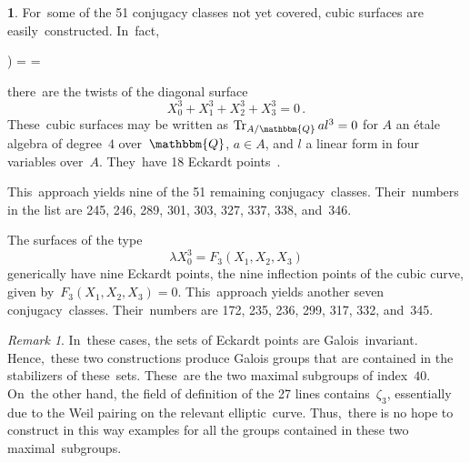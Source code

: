 \documentclass[reqno]{amsart}
\theoremstyle{definition}
\newtheorem{ttt}[theorem]{}
\theoremstyle{remark}
\newtheorem{rem}[theorem]{Remark}
\numberwithin{equation}{section}
\newcommand{\bbQ}{\mathbbm{Q}}
\newcommand{\Tr}{\mathop{\rm Tr}\nolimits}
\newcounter{iii}
\newenvironment{iii}{\begin{list}{\rm \roman{iii}) }%
{\usecounter{iii} \leftmargin=0.0pt \labelsep=0.0pt %
\listparindent=0.0pt \labelwidth=0.0pt \parsep=\smallskipamount%
 \itemsep=0.0pt \topsep=0.0pt \partopsep=\smallskipamount}}{\end{list}}
\begin{document}
\begin{ttt}\smallskip
For~some of the 51 conjugacy classes not yet covered, cubic surfaces are easily~constructed. In~fact,

\begin{iii}
\item
there~are the twists of the diagonal surface
$$X_0^3 + X_1^3 + X_2^3 + X_3^3 = 0 \, .$$
These~cubic surfaces may be written as
$\Tr_{A/\bbQ} al^3 = 0$
for
$A$
an \'etale algebra of
degree~$4$
over~$\bbQ$,
$a \in A$,
and
$l$
a linear form in four variables
over~$A$.
They~have 18 Eckardt points~\cite[section~9.1.4]{Do}.

This~approach yields nine of the 51 remaining conjugacy~classes. Their~numbers in the list are 245, 246, 289, 301, 303, 327, 337, 338, and~346.
\item
The surfaces of the type
$$\lambda X_0^3 = F_3(X_1, X_2, X_3)$$
generically have nine Eckardt points, the nine inflection points of the cubic curve, given
by~$F_3(X_1, X_2, X_3) = 0$.
This~approach yields another seven conjugacy~classes. Their~numbers are 172, 235, 236, 299, 317, 332, and~345.
\end{iii}
\end{ttt}

\begin{rem}\smallskip
In~these cases, the sets of Eckardt points are Galois~invariant. Hence,~these two constructions produce Galois groups that are contained in the
stabilizers of these~sets. These~are the two maximal subgroups of
index~$40$.
On~the other hand, the field of definition of the 27 lines
contains~$\zeta_3$,
essentially due to the Weil pairing on the relevant elliptic~curve. Thus,~there is no hope to construct in this way examples for all the groups contained in these two maximal~subgroups.
\end{rem}
\end{document}
